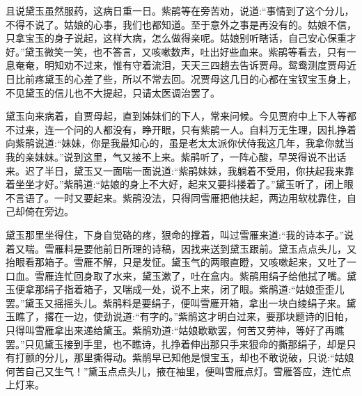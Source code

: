 \begin{parag}
    且说黛玉虽然服药，这病日重一日。紫鹃等在旁苦劝，说道:“事情到了这个分儿，不得不说了。姑娘的心事，我们也都知道。至于意外之事是再没有的。姑娘不信，只拿宝玉的身子说起，这样大病，怎么做得亲呢。姑娘别听瞎话，自己安心保重才好。”黛玉微笑一笑，也不答言，又咳嗽数声，吐出好些血来。紫鹃等看去，只有一息奄奄，明知劝不过来，惟有守着流泪，天天三四趟去告诉贾母。鸳鸯测度贾母近日比前疼黛玉的心差了些，所以不常去回。况贾母这几日的心都在宝钗宝玉身上，不见黛玉的信儿也不大提起，只请太医调治罢了。
\end{parag}


\begin{parag}
    黛玉向来病着，自贾母起，直到姊妹们的下人，常来问候。今见贾府中上下人等都不过来，连一个问的人都没有，睁开眼，只有紫鹃一人。自料万无生理，因扎挣着向紫鹃说道:“妹妹，你是我最知心的，虽是老太太派你伏侍我这几年，我拿你就当我的亲妹妹。”说到这里，气又接不上来。紫鹃听了，一阵心酸，早哭得说不出话来。迟了半日，黛玉又一面喘一面说道:“紫鹃妹妹，我躺着不受用，你扶起我来靠着坐坐才好。”紫鹃道:“姑娘的身上不大好，起来又要抖搂着了。”黛玉听了，闭上眼不言语了。一时又要起来。紫鹃没法，只得同雪雁把他扶起，两边用软枕靠住，自己却倚在旁边。
\end{parag}


\begin{parag}
    黛玉那里坐得住，下身自觉硌的疼，狠命的撑着，叫过雪雁来道:“我的诗本子。”说着又喘。雪雁料是要他前日所理的诗稿，因找来送到黛玉跟前。黛玉点点头儿，又抬眼看那箱子。雪雁不解，只是发怔。黛玉气的两眼直瞪，又咳嗽起来，又吐了一口血。雪雁连忙回身取了水来，黛玉漱了，吐在盒内。紫鹃用绢子给他拭了嘴。黛玉便拿那绢子指着箱子，又喘成一处，说不上来，闭了眼。紫鹃道:“姑娘歪歪儿罢。”黛玉又摇摇头儿。紫鹃料是要绢子，便叫雪雁开箱，拿出一块白绫绢子来。黛玉瞧了，撂在一边，使劲说道:“有字的。”紫鹃这才明白过来，要那块题诗的旧帕，只得叫雪雁拿出来递给黛玉。紫鹃劝道:“姑娘歇歇罢，何苦又劳神，等好了再瞧罢。”只见黛玉接到手里，也不瞧诗，扎挣着伸出那只手来狠命的撕那绢子，却是只有打颤的分儿，那里撕得动。紫鹃早已知他是恨宝玉，却也不敢说破，只说:“姑娘何苦自己又生气！”黛玉点点头儿，掖在袖里，便叫雪雁点灯。雪雁答应，连忙点上灯来。
\end{parag}


